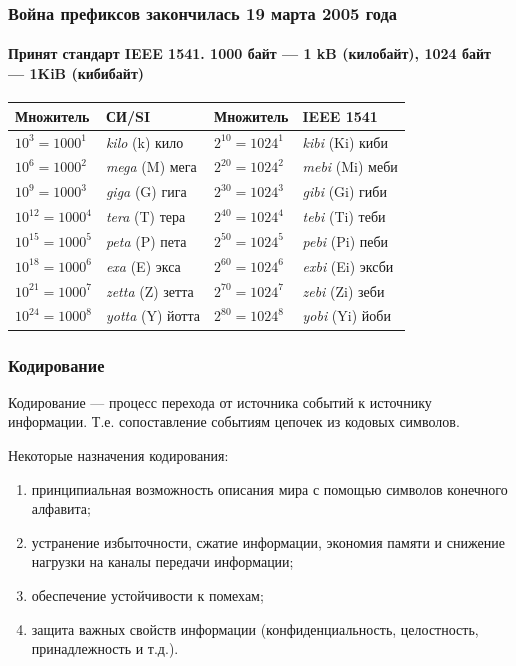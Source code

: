 \begin{frame}
    \frametitle{Война префиксов закончилась 19 марта 2005 года}
    \framesubtitle{Принят стандарт IEEE 1541. 1000 байт --- 1 kB (килобайт), 1024 байт --- 1KiB (кибибайт)}
    
    \begin{center}
        \begin{tabular}[c]{|l|l||l|l|}
            \hline\hline
            Множитель          & СИ/SI                  & Множитель        & IEEE 1541 \\
            \hline\hline
            $10^3  = 1000^1$   & \emph{kilo} (k) кило   & $2^{10} =1024^1$ & \emph{kibi} (Ki) киби\\ \hline
            $10^6  = 1000^2$   & \emph{mega} (M) мега   & $2^{20} =1024^2$ & \emph{mebi} (Mi) меби \\ \hline
            $10^9  = 1000^3$   & \emph{giga} (G) гига   & $2^{30} =1024^3$ & \emph{gibi} (Gi) гиби\\ \hline
            $10^{12} = 1000^4$ & \emph{tera} (T) тера   & $2^{40} =1024^4$ & \emph{tebi} (Ti) теби\\ \hline
            $10^{15} = 1000^5$ & \emph{peta} (P) пета   & $2^{50} =1024^5$ & \emph{pebi} (Pi) пеби\\ \hline
            $10^{18} = 1000^6$ & \emph{exa} (E) экса    & $2^{60} =1024^6$ & \emph{exbi} (Ei) эксби\\ \hline
            $10^{21} = 1000^7$ & \emph{zetta} (Z) зетта & $2^{70} =1024^7$ & \emph{zebi} (Zi) зеби\\ \hline
            $10^{24} = 1000^8$ & \emph{yotta} (Y) йотта & $2^{80} =1024^8$ & \emph{yobi} (Yi) йоби\\ \hline
        \end{tabular}
    \end{center}
\end{frame}

\begin{frame}
    \frametitle{Кодирование}
    
    \begin{definition}
        \alert{Кодирование} --- процесс перехода от \alert{источника событий} к \alert{источнику информации}. Т.е.  сопоставление \alert{событиям} цепочек из \alert{кодовых символов}.
    \end{definition}
    
    Некоторые назначения кодирования:
    \begin{enumerate}
        \item принципиальная возможность описания мира с помощью символов конечного алфавита;
        \item устранение избыточности, сжатие информации, экономия памяти и снижение нагрузки на каналы передачи информации;
        \item обеспечение устойчивости к помехам;
        \item защита важных свойств информации (конфиденциальность, целостность, принадлежность и т.д.).
    \end{enumerate}
\end{frame}

